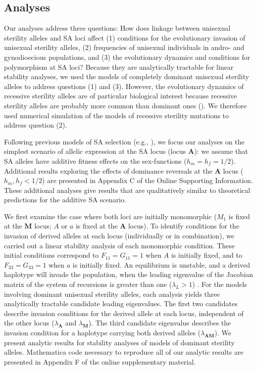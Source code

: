 \documentclass{article}
\begin{document}
\subsection*{Analyses} \label{subsec:analyses}

Our analyses address three questions: How does linkage between unisexual sterility alleles and SA loci affect (1) conditions for the evolutionary invasion of unisexual sterility alleles, (2) frequencies of unisexual individuals in andro- and gynodioecious populations, and (3) the evolutionary dynamics and conditions for polymorphism at SA loci? Because they are analytically tractable for linear stability analyses, we used the models of completely dominant unisexual sterility alleles to address questions (1) and (3). However, the evolutionary dynamics of recessive sterility alleles are of particular biological interest because recessive sterility alleles are probably more common than dominant ones (\citealt{Charlesworth1978a}). We therefore used numerical simulation of the models of recessive sterility mutations to address question (2). 

Following previous models of SA selection (e.g., \citealp{Kidwell1977, Prout2000, JordanConnallon2014}), we focus our analyses on the simplest scenario of allelic expression at the SA locus (locus $\mathbf{A}$): we assume that SA alleles have additive fitness effects on the sex-functions ($h_m = h_f = 1/2$). Additional results exploring the effects of dominance reversals at the $\mathbf{A}$ locus ($h_m, h_f < 1/2$) are presented in Appendix C of the Online Supporting Information. These additional analyses give results that are qualitatively similar to theoretical predictions for the additive SA scenario.

We first examine the case where both loci are initially monomorphic ($M_1$ is fixed at the $\mathbf{M}$ locus; $A$ or $a$ is fixed at the $\mathbf{A}$ locus). To identify conditions for the invasion of derived alleles at each locus (individually or in combination), we carried out a linear stability analysis of each monomorphic condition. These initial conditions correspond to $F_{11} = G_{11} = 1$ when $A$ is initially fixed, and to $F_{33} = G_{33} = 1$ when $a$ is initially fixed. An equilibrium is unstable, and a derived haplotype will invade the population, when the leading eigenvalue of the Jacobian matrix of the system of recursions is greater than one ($\lambda_L > 1$) \citep{OttoDay2007}. For the models involving dominant unisexual sterility alleles, each analysis yields three analytically tractable candidate leading eigenvalues. The first two candidates describe invasion conditions for the derived allele at each locus, independent of the other locus ($\lambda_\mathbf{A}$ and $\lambda_\mathbf{M}$). The third candidate eigenvalue describes the invasion condition for a haplotype carrying both derived alleles ($\lambda_\mathbf{AM}$). We present analytic results for stability analyses of models of dominant sterility alleles. Mathematica code necessary to reproduce all of our analytic results are presented in Appendix F of the online supplementary material.
\end{document}
